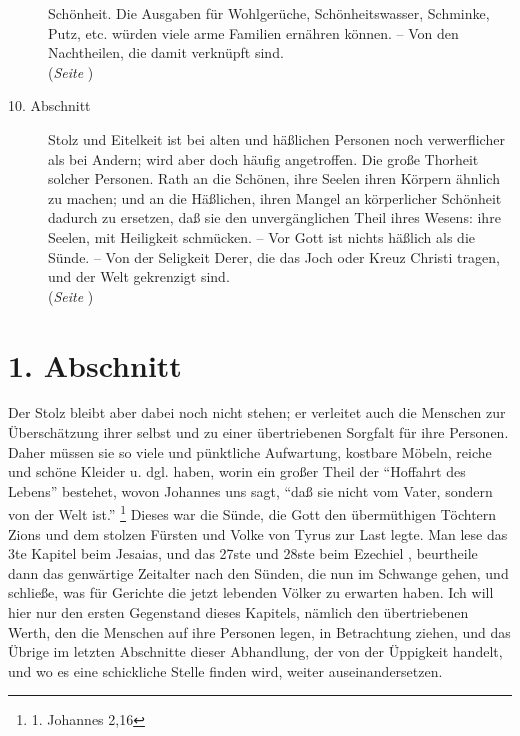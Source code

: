 \begin{description}
Schönheit. Die Ausgaben für Wohlgerüche, Schönheitswasser, Schminke, Putz, etc.
würden viele arme Familien ernähren können. -- Von den Nachtheilen, die damit
verknüpft sind.
\\(\textit{Seite \pageref{kap11_ab9}})
\item[10. Abschnitt] Stolz und Eitelkeit ist bei alten und häßlichen Personen
noch verwerflicher als bei Andern; wird aber doch häufig angetroffen. Die große
Thorheit solcher Personen. Rath an die Schönen, ihre Seelen ihren Körpern
ähnlich zu machen; und an die Häßlichen, ihren Mangel an körperlicher Schönheit
dadurch zu ersetzen, daß sie den unvergänglichen Theil ihres Wesens: ihre
Seelen, mit Heiligkeit schmücken. -- Vor Gott ist nichts häßlich als die Sünde.
-- Von der Seligkeit Derer, die das Joch oder Kreuz Christi tragen, und der Welt
gekrenzigt sind.
\\(\textit{Seite \pageref{kap11_ab10}})

\end{description}
\normalsize

\section{1. Abschnitt} \label{kap11_ab1}

Der Stolz bleibt aber dabei noch nicht stehen; er verleitet auch die Menschen
zur Überschätzung ihrer selbst und zu einer übertriebenen Sorgfalt für ihre
Personen. Daher müssen sie so viele und pünktliche Aufwartung, kostbare
Möbeln,
reiche und schöne Kleider u. dgl. haben, worin ein großer Theil
der "`Hoffahrt
des Lebens"' bestehet, wovon Johannes uns sagt,
"`daß sie nicht vom Vater,
sondern von der Welt ist."'
\footnote{1. Johannes 2,16}
Dieses war die Sünde, die Gott
den übermüthigen Töchtern Zions und dem stolzen
Fürsten und Volke von Tyrus zur
Last legte. Man lese das 3te Kapitel beim Jesaias, und das 27ste und 28ste beim
Ezechiel ,
beurtheile dann das genwärtige Zeitalter nach den Sünden, die nun im
Schwange gehen, und schließe, was für Gerichte die jetzt lebenden Völker zu
erwarten haben. Ich will hier nur den ersten Gegenstand dieses Kapitels, nämlich
den übertriebenen Werth, den die Menschen auf ihre Personen legen, in
Betrachtung ziehen, und das Übrige im letzten Abschnitte dieser Abhandlung, der
von der Üppigkeit handelt, und wo es eine schickliche Stelle finden wird,
weiter auseinandersetzen.

